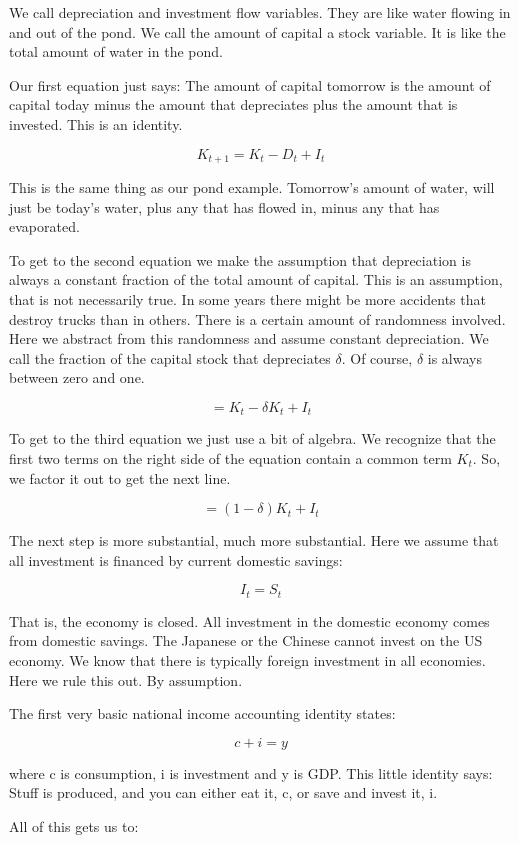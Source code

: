 \documentclass[
]{book}
\begin{document}
We call depreciation and investment flow variables. They are like water flowing in and out of the pond. We call the amount of capital a stock variable. It is like the total amount of water in the pond.

Our first equation just says: The amount of capital tomorrow is the amount of capital today minus the amount that depreciates plus the amount that is invested. This is an identity.

\[K_{t+1}=K_t-D_t+I_t\]

This is the same thing as our pond example. Tomorrow's amount of water, will just be today's water, plus any that has flowed in, minus any that has evaporated.

To get to the second equation we make the assumption that depreciation is always a constant fraction of the total amount of capital. This is an assumption, that is not necessarily true. In some years there might be more accidents that destroy trucks than in others. There is a certain amount of randomness involved. Here we abstract from this randomness and assume constant depreciation. We call the fraction of the capital stock that depreciates \(\delta\). Of course, \(\delta\) is always between zero and one.

\[=K_t- \delta K_t+I_t\]

To get to the third equation we just use a bit of algebra. We recognize that the first two terms on the right side of the equation contain a common term \(K_t\). So, we factor it out to get the next line.

\[=(1-\delta) K_t+I_t\]

The next step is more substantial, much more substantial. Here we assume that all investment is financed by current domestic savings:

\[I_t=S_t\]

That is, the economy is closed. All investment in the domestic economy comes from domestic savings. The Japanese or the Chinese cannot invest on the US economy. We know that there is typically foreign investment in all economies. Here we rule this out. By assumption.

The first very basic national income accounting identity states:

\[c + i = y\]

where c is consumption, i is investment and y is GDP. This little identity says: Stuff is produced, and you can either eat it, c, or save and invest it, i.

All of this gets us to:
\end{document}
